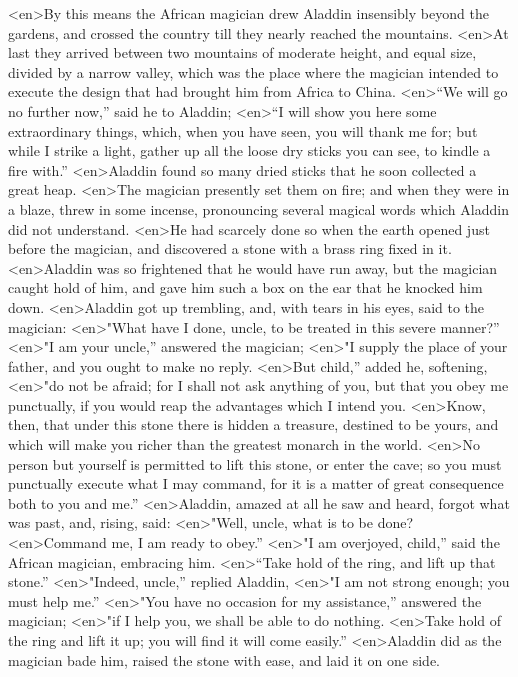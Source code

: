 <en>By this means the African magician drew Aladdin insensibly beyond the gardens, and crossed the country till they nearly reached the mountains.
<en>At last they arrived between two mountains of moderate height, and equal size, divided by a narrow valley, which was the place where the magician intended to execute the design that had brought him from Africa to China.
<en>“We will go no further now,” said he to Aladdin; 
<en>“I will show you here some extraordinary things, which, when you have seen, you will thank me for; but while I strike a light, gather up all the loose dry sticks you can see, to kindle a fire with.”
<en>Aladdin found so many dried sticks that he soon collected a great heap.
<en>The magician presently set them on fire; and when they were in a blaze, threw in some incense, pronouncing several magical words which Aladdin did not understand.
<en>He had scarcely done so when the earth opened just before the magician, and discovered a stone with a brass ring fixed in it.
<en>Aladdin was so frightened that he would have run away, but the magician caught hold of him, and gave him such a box on the ear that he knocked him down.
<en>Aladdin got up trembling, and, with tears in his eyes, said to the magician:
<en>"What have I done, uncle, to be treated in this severe manner?”
<en>"I am your uncle,” answered the magician;
<en>"I supply the place of your father, and you ought to make no reply.
<en>But child,” added he, softening,
<en>"do not be afraid; for I shall not ask anything of you, but that you obey me punctually, if you would reap the advantages which I intend you.
<en>Know, then, that under this stone there is hidden a treasure, destined to be yours, and which will make you richer than the greatest monarch in the world.
<en>No person but yourself is permitted to lift this stone, or enter the cave; so you must punctually execute what I may command, for it is a matter of great consequence both to you and me.”
<en>Aladdin, amazed at all he saw and heard, forgot what was past, and, rising, said:
<en>"Well, uncle, what is to be done?
<en>Command me, I am ready to obey.”
<en>"I am overjoyed, child,” said the African magician, embracing him.
<en>“Take hold of the ring, and lift up that stone.”
<en>"Indeed, uncle,” replied Aladdin,
<en>"I am not strong enough; you must help me.”
<en>"You have no occasion for my assistance,” answered the magician;
<en>"if I help you, we shall be able to do nothing.
<en>Take hold of the ring and lift it up; you will find it will come easily.”
<en>Aladdin did as the magician bade him, raised the stone with ease, and laid it on one side.
